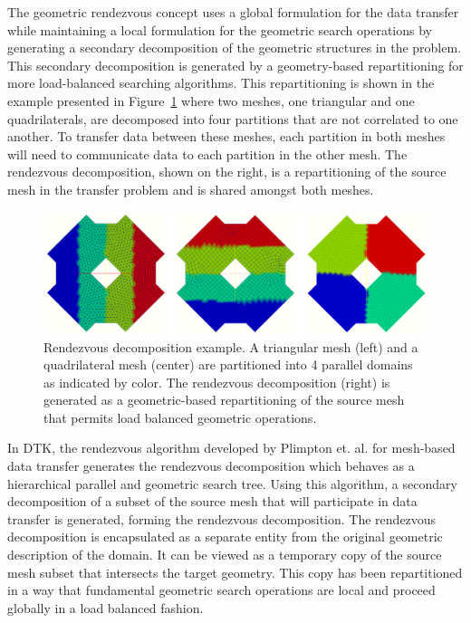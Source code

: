 \documentclass{mc2013}
\begin{document}
\label{subsec:rendezvous_algorithm}

The geometric rendezvous concept uses a global formulation for the
data transfer while maintaining a local formulation for the geometric
search operations by generating a secondary decomposition of the
geometric structures in the problem. This secondary decomposition is
generated by a geometry-based repartitioning for more load-balanced
searching algorithms. This repartitioning is shown in the example
presented in Figure~\ref{fig:rendezvous_example} where two meshes, one
triangular and one quadrilaterals, are decomposed into four partitions
that are not correlated to one another. To transfer data between these
meshes, each partition in both meshes will need to communicate data to
each partition in the other mesh. The rendezvous decomposition, shown
on the right, is a repartitioning of the source mesh in the transfer
problem and is shared amongst both meshes.
\begin{figure}[htpb!]
  \centering \includegraphics[width=6in]{rendezvous_example.png}
  \caption{Rendezvous decomposition example. A triangular mesh (left)
    and a quadrilateral mesh (center) are partitioned into 4 parallel
    domains as indicated by color. The rendezvous decomposition
    (right) is generated as a geometric-based repartitioning of the
    source mesh that permits load balanced geometric operations.}
  \label{fig:rendezvous_example}
\end{figure}

In DTK, the rendezvous algorithm developed by Plimpton
et. al. \cite{Plimpton_2004} for mesh-based data transfer generates
the rendezvous decomposition which behaves as a hierarchical parallel
and geometric search tree.  Using this algorithm, a secondary
decomposition of a subset of the source mesh that will participate in
data transfer is generated, forming the rendezvous decomposition. The
rendezvous decomposition is encapsulated as a separate entity from the
original geometric description of the domain. It can be viewed as a
temporary copy of the source mesh subset that intersects the target
geometry. This copy has been repartitioned in a way that fundamental
geometric search operations are local and proceed globally in a load
balanced fashion.
\end{document}
